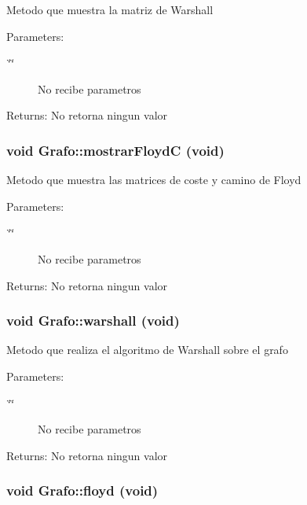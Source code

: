 Metodo que muestra la matriz de Warshall \begin{Desc}
\item[Parameters:]
\begin{description}
\item[{\em \char`\"{}\char`\"{}}]No recibe parametros \end{description}
\end{Desc}
\begin{Desc}
\item[Returns:]No retorna ningun valor \end{Desc}
\hypertarget{classGrafo_3ca9a9b3ad1c598442d05a528a75a5da}{
\subsubsection[mostrarFloydC]{\setlength{\rightskip}{0pt plus 5cm}void Grafo::mostrarFloydC (void)}}
\label{classGrafo_3ca9a9b3ad1c598442d05a528a75a5da}


Metodo que muestra las matrices de coste y camino de Floyd \begin{Desc}
\item[Parameters:]
\begin{description}
\item[{\em \char`\"{}\char`\"{}}]No recibe parametros \end{description}
\end{Desc}
\begin{Desc}
\item[Returns:]No retorna ningun valor \end{Desc}
\hypertarget{classGrafo_8cbe645ba4ee198c1777186bf2b2a2d7}{
\subsubsection[warshall]{\setlength{\rightskip}{0pt plus 5cm}void Grafo::warshall (void)}}
\label{classGrafo_8cbe645ba4ee198c1777186bf2b2a2d7}


Metodo que realiza el algoritmo de Warshall sobre el grafo \begin{Desc}
\item[Parameters:]
\begin{description}
\item[{\em \char`\"{}\char`\"{}}]No recibe parametros \end{description}
\end{Desc}
\begin{Desc}
\item[Returns:]No retorna ningun valor \end{Desc}
\hypertarget{classGrafo_fb0510598fcefea15428e0f2cf1144dc}{
\subsubsection[floyd]{\setlength{\rightskip}{0pt plus 5cm}void Grafo::floyd (void)}}
\label{classGrafo_fb0510598fcefea15428e0f2cf1144dc}


